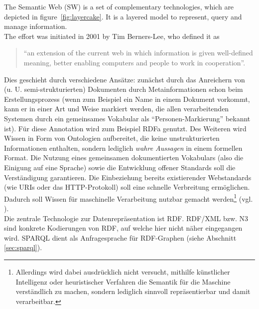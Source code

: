 The Semantic Web (SW) is a set of complementary technologies, which are depicted in figure~\ref{fig:layercake}. It is a layered model to represent, query and manage information.\\
The effort was initiated in 2001 by Tim Berners-Lee, who defined it as 
\begin{quote}
"`an extension of the current web in which information is given well-defined
meaning, better enabling computers and people to work in cooperation"'.
\cite{berners}
\end{quote}
Dies geschieht durch verschiedene Ansätze: zunächst durch das Anreichern von (u. U. semi-struk\-tur\-iert\-en) Dokumenten durch Metainformationen schon beim Erstellungsprozess (wenn zum Beispiel ein Name in einem Dokument vorkommt, kann er in einer Art und Weise markiert werden, die allen verarbeitenden Systemen durch ein gemeinsames Vokabular als "`Personen-Markierung"' bekannt ist). Für diese Annotation wird zum Beispiel RDFa genutzt. Des Weiteren wird Wissen in Form von Ontologien aufbereitet, die keine unstrukturierten Informationen enthalten, sondern lediglich \emph{wahre Aussagen} in einem formellen Format. Die Nutzung eines gemeinsamen dokumentierten Vokabulars (also die Einigung auf eine Sprache) sowie die Entwicklung offener Standards soll die Verständigung garantieren. Die Einbeziehung bereits existierender Webstandards (wie URIs oder das HTTP-Protokoll) soll eine schnelle Verbreitung ermöglichen. Dadurch soll Wissen für maschinelle Verarbeitung nutzbar gemacht werden\footnote{Allerdings wird dabei ausdrücklich nicht versucht, mithilfe künstlicher Intelligenz oder heuristischer Verfahren die Semantik für die Maschine verständlich zu machen, sondern lediglich sinnvoll repräsentierbar und damit verarbeitbar.} (vgl. \cite{hitzler}).\\
Die zentrale Technologie zur Datenrepräsentation ist RDF. RDF/XML bzw. N3 sind konkrete Kodierungen von RDF, auf welche hier nicht näher eingegangen wird. SPARQL dient als Anfragesprache für RDF-Graphen (siehe Abschnitt \ref{sec:sparql}). 


